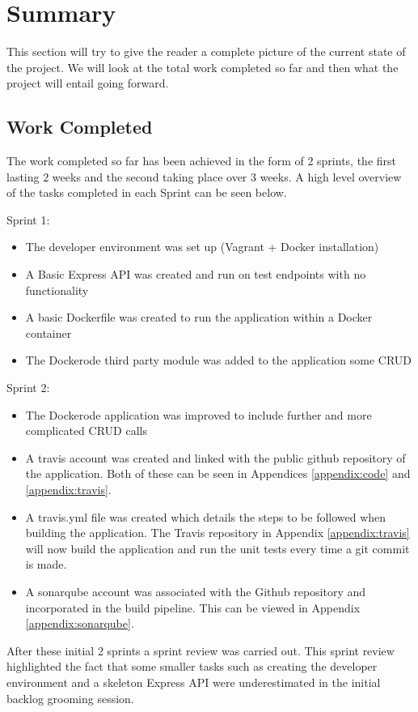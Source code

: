 \section{Summary}
This section will try to give the reader a complete picture of the current state of the project. We will look at the total work completed so far and then what the project will entail going forward.

\subsection{Work Completed}
The work completed so far has been achieved in the form of 2 sprints, the first lasting 2 weeks and the second taking place over 3 weeks. A high level overview of the tasks completed in each Sprint can be seen below.

Sprint 1:
\begin{itemize}
	\item The developer environment was set up (Vagrant + Docker installation)
	\item A Basic Express \gls{API} was created and run on test endpoints with no functionality
	\item A basic Dockerfile was created to run the application within a Docker container
	\item The Dockerode third party module was added to the application some \gls{CRUD}
\end{itemize} 

Sprint 2:
\begin{itemize}
	\item The Dockerode application was improved to include further and more complicated \gls{CRUD} calls
	\item A \gls{travis} account was created and linked with the public \gls{github} repository of the application. Both of these can be seen in Appendices \ref{appendix:code} and \ref{appendix:travis}.
	\item A travis.yml file was created which details the steps to be followed when building the application. The Travis repository in Appendix \ref{appendix:travis} will now build the application and run the unit tests every time a \gls{git} commit is made.
	\item A \gls{sonarqube} account was associated with the Github repository and incorporated in the build pipeline. This can be viewed in Appendix \ref{appendix:sonarqube}.
\end{itemize}

After these initial 2 sprints a sprint review was carried out. This sprint review highlighted the fact that some smaller tasks such as creating the developer environment and a skeleton Express API were underestimated in the initial backlog grooming session.

